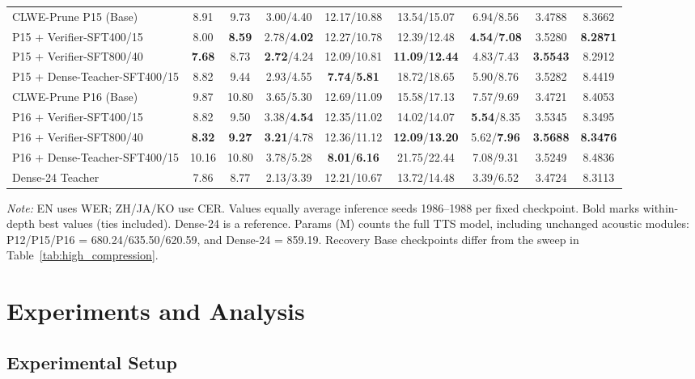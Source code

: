 \documentclass{article}
\newcounter{savedtablecounter}
\begin{document}
\begin{table}[!t]
\begin{tabular}{lcccccccc}
\addlinespace
CLWE-Prune P15 (Base) & 8.91 & 9.73 &
3.00/4.40 & 12.17/10.88 & 13.54/15.07 & 6.94/8.56 & 3.4788 & 8.3662 \\
P15 + Verifier-SFT400/15 & 8.00 & \textbf{8.59} &
2.78/\textbf{4.02} & 12.27/10.78 & 12.39/12.48 & \textbf{4.54}/\textbf{7.08} & 3.5280 & \textbf{8.2871} \\
P15 + Verifier-SFT800/40 & \textbf{7.68} & 8.73 &
\textbf{2.72}/4.24 & 12.09/10.81 & \textbf{11.09}/\textbf{12.44} & 4.83/7.43 & \textbf{3.5543} & 8.2912 \\
P15 + Dense-Teacher-SFT400/15 & 8.82 & 9.44 &
2.93/4.55 & \textbf{7.74}/\textbf{5.81} & 18.72/18.65 & 5.90/8.76 & 3.5282 & 8.4419 \\
\addlinespace
CLWE-Prune P16 (Base) & 9.87 & 10.80 &
3.65/5.30 & 12.69/11.09 & 15.58/17.13 & 7.57/9.69 & 3.4721 & 8.4053 \\
P16 + Verifier-SFT400/15 & 8.82 & 9.50 &
3.38/\textbf{4.54} & 12.35/11.02 & 14.02/14.07 & \textbf{5.54}/8.35 & 3.5345 & 8.3495 \\
P16 + Verifier-SFT800/40 & \textbf{8.32} & \textbf{9.27} &
\textbf{3.21}/4.78 & 12.36/11.12 & \textbf{12.09}/\textbf{13.20} & 5.62/\textbf{7.96} & \textbf{3.5688} & \textbf{8.3476} \\
P16 + Dense-Teacher-SFT400/15 & 10.16 & 10.80 &
3.78/5.28 & \textbf{8.01}/\textbf{6.16} & 21.75/22.44 & 7.08/9.31 & 3.5249 & 8.4836 \\
\addlinespace
Dense-24 Teacher & 7.86 & 8.77 &
2.13/3.39 & 12.21/10.67 & 13.72/14.48 & 3.39/6.52 & 3.4724 & 8.3113 \\
\bottomrule
\end{tabular}%
\vspace{0.5mm}
\parbox{\textwidth}{\small\textit{Note:}
EN uses WER; ZH/JA/KO use CER. Values equally average inference seeds
1986--1988 per fixed checkpoint. Bold marks within-depth best values
(ties included). Dense-24 is a reference. Params (M) counts the full TTS
model, including unchanged acoustic modules: P12/P15/P16 =
680.24/635.50/620.59, and Dense-24 = 859.19. Recovery Base checkpoints
differ from the sweep in Table~\ref{tab:high_compression}.}
\end{table}
\setcounter{table}{\value{savedtablecounter}}

\section{Experiments and Analysis}
\label{sec:experiments}

\subsection{Experimental Setup}
\label{sec:setup}
\end{document}
